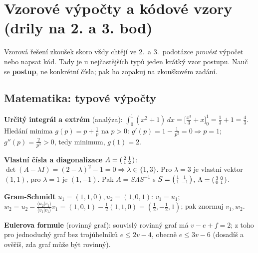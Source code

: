 \section{Vzorové výpočty a kódové vzory (drily na 2. a 3. bod)}

{\small Vzorová řešení zkoušek skoro vždy chtějí ve 2.\ a 3.\ podotázce \emph{provést}
výpočet nebo napsat kód. Tady je u nejčastějších typů jeden krátký vzor postupu. Nauč se
\textbf{postup}, ne konkrétní čísla; pak ho zopakuj na zkouškovém zadání.}

\subsection{Matematika: typové výpočty}

\begin{odpoved}
\setlength{\parskip}{2pt}
\noindent\textbf{Určitý integrál a extrém} (analýza): $\int_0^1 (x^2+1)\,dx
=\bigl[\tfrac{x^3}{3}+x\bigr]_0^1=\tfrac13+1=\tfrac43$. Hledání minima $g(p)=p+\tfrac1p$ na
$p>0$: $g'(p)=1-\tfrac1{p^2}=0\Rightarrow p=1$; $g''(p)=\tfrac{2}{p^3}>0$, tedy minimum,
$g(1)=2$.\par
\noindent\textbf{Vlastní čísla a diagonalizace} $A=\begin{psmallmatrix}2&1\\1&2\end{psmallmatrix}$:
$\det(A-\lambda I)=(2-\lambda)^2-1=0\Rightarrow \lambda\in\{1,3\}$. Pro $\lambda=3$ je vlastní
vektor $(1,1)$, pro $\lambda=1$ je $(1,-1)$. Pak $A=S\Lambda S^{-1}$ s
$S=\begin{psmallmatrix}1&1\\1&-1\end{psmallmatrix}$, $\Lambda=\begin{psmallmatrix}3&0\\0&1\end{psmallmatrix}$.\par
\noindent\textbf{Gram-Schmidt} $u_1=(1,1,0),u_2=(1,0,1)$: $v_1=u_1$;
$w_2=u_2-\tfrac{\langle u_2|v_1\rangle}{\langle v_1|v_1\rangle}v_1=(1,0,1)-\tfrac12(1,1,0)
=(\tfrac12,-\tfrac12,1)$; pak znormuj $v_1,w_2$.\par
\noindent\textbf{Eulerova formule} (rovinný graf): souvislý rovinný graf má $v-e+f=2$;
z toho pro jednoduchý graf bez trojúhelníků $e\le 2v-4$, obecně $e\le 3v-6$ (dosadíš a
ověříš, zda graf může být rovinný).
\end{odpoved}

